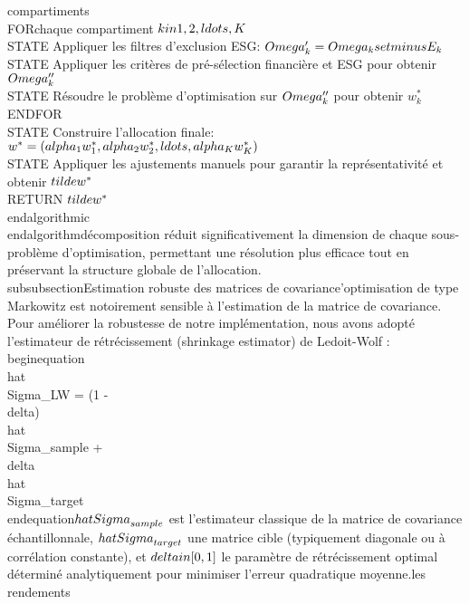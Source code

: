 compartiments\n\n\\FOR{chaque compartiment $k \\in \\{1, 2, \\ldots, K\\}$}\n    \\STATE Appliquer les filtres d'exclusion ESG: $\\Omega_k' = \\Omega_k \\setminus E_k$\n    \\STATE Appliquer les critères de pré-sélection financière et ESG pour obtenir $\\Omega_k''$\n    \\STATE Résoudre le problème d'optimisation sur $\\Omega_k''$ pour obtenir $w_k^*$\n\\ENDFOR\n\n\\STATE Construire l'allocation finale: $w^* = (\\alpha_1 w_1^*, \\alpha_2 w_2^*, \\ldots, \\alpha_K w_K^*)$\n\\STATE Appliquer les ajustements manuels pour garantir la représentativité et obtenir $\\tilde{w}^*$\n\\RETURN $\\tilde{w}^*$\n\\end{algorithmic}\n\\end{algorithm}\n\nCette décomposition réduit significativement la dimension de chaque sous-problème d'optimisation, permettant une résolution plus efficace tout en préservant la structure globale de l'allocation.\n\n\\subsubsection{Estimation robuste des matrices de covariance}\n\nL'optimisation de type Markowitz est notoirement sensible à l'estimation de la matrice de covariance. Pour améliorer la robustesse de notre implémentation, nous avons adopté l'estimateur de rétrécissement (shrinkage estimator) de Ledoit-Wolf :\n\n\\begin{equation}\n\\hat{\\Sigma}_{LW} = (1 - \\delta) \\hat{\\Sigma}_{sample} + \\delta \\hat{\\Sigma}_{target}\n\\end{equation}\n{} $\\hat{\\Sigma}_{sample}$ est l'estimateur classique de la matrice de covariance échantillonnale, $\\hat{\\Sigma}_{target}$ une matrice cible (typiquement diagonale ou à corrélation constante), et $\\delta \\in [0,1]$ le paramètre de rétrécissement optimal déterminé analytiquement pour minimiser l'erreur quadratique moyenne.\n\nPour les rendements 
